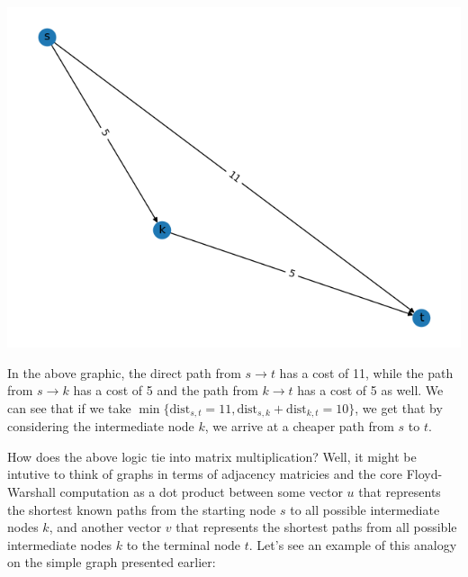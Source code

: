 \documentclass[12pt]{article}
\begin{document}
\begin{center}
    \includegraphics[scale=0.5]{media/Figure_1.png}
\end{center}

In the above graphic, the direct path from $s \to t$ has a cost of 11, while the path from $s \to k$ has a cost of 5 and the path from $k \to t$ has a cost of 5 as well. We can see that if we take $\min \{\mathrm{dist}_{s,t} = 11, \mathrm{dist}_{s,k} + \mathrm{dist}_{k,t} = 10 \}$, we get that by considering the intermediate node $k$, we arrive at a cheaper path from $s$ to $t$.

How does the above logic tie into matrix multiplication? Well, it might be intutive to think of graphs in terms of adjacency matricies and the core Floyd-Warshall computation as a dot product between some vector $u$ that represents the shortest known paths from the starting node $s$ to all possible intermediate nodes $k$, and another vector $v$ that represents the shortest paths from all possible intermediate nodes $k$ to the terminal node $t$. Let's see an example of this analogy on the simple graph presented earlier:
\end{document}

